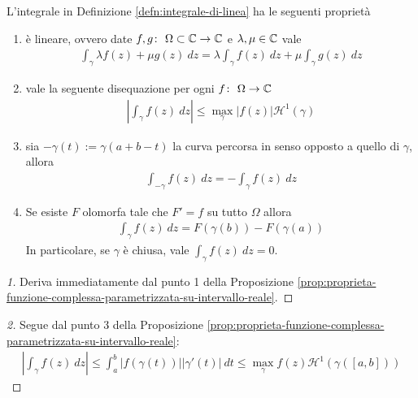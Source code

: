 \begin{proposition}
	\label{prop:proprieta-integrale-di-linea}
	L'integrale in Definizione \ref{defn:integrale-di-linea} ha le seguenti proprietà
	\begin{enumerate}
		\item è lineare, ovvero date $f,g \colon\ \Omega \subset \mathbb{C} \rightarrow \mathbb{C}$ e $\lambda, \mu \in \mathbb{C}$ vale
		\begin{equation*}
		\begin{aligned}
		\int_{\gamma} \lambda f(z) + \mu g(z) \ dz =  \lambda \int_{\gamma} f(z) \ dz + \mu \int_{\gamma} g(z) \ dz 
		\end{aligned}
		\end{equation*}
		\item vale la seguente disequazione per ogni $f \colon\ \Omega \rightarrow \mathbb{C}$
		\begin{equation*}
		\begin{aligned}
		\left|\int_{\gamma} f(z) \ dz\right| \le \max_{\gamma} |f(z)| \mathcal{H}^1(\gamma)	
		\end{aligned}
		\end{equation*}
		\item sia $-\gamma(t) := \gamma(a+b-t)$ la curva percorsa in senso opposto a quello di $\gamma$, allora
		\begin{equation*}
		\begin{aligned}
		\int_{-\gamma} f(z) \ dz = - \int_{\gamma} f(z) \ dz
		\end{aligned}
		\end{equation*}
		\item Se esiste $F$ olomorfa tale che $F' = f$ su tutto $\Omega$ allora
		\begin{equation*}
		\begin{aligned}
		\int_\gamma f(z) \ dz = F(\gamma(b)) - F(\gamma(a))
		\end{aligned}
		\end{equation*}
		In particolare, se $\gamma$ è chiusa, vale $\int_\gamma f(z)\ dz = 0$.
	\end{enumerate}
\end{proposition}
\begin{proof}[1]
	Deriva immediatamente dal punto 1 della Proposizione \ref{prop:proprieta-funzione-complessa-parametrizzata-su-intervallo-reale}.
\end{proof}
\begin{proof}[2]	
	Segue dal punto $3$ della Proposizione \ref{prop:proprieta-funzione-complessa-parametrizzata-su-intervallo-reale}:
	\begin{equation*}
	\begin{aligned}
	\left|\int_\gamma f(z)\ dz\right| \le \int^b_a |f(\gamma(t))||\gamma'(t)| \ dt \le \max_{\gamma} f(z) \mathcal{H}^1(\gamma(\left[a,b\right])) 
	\end{aligned}
	\end{equation*}
\end{proof}
